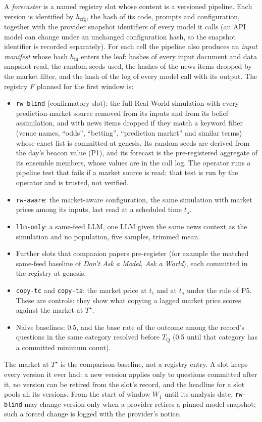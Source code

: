 \documentclass[11pt]{article}
\newcommand{\Ts}{T^{\star}}
\newcommand{\tQ}{T_{\mathrm{Q}}}
\newcommand{\tc}{t_{\mathrm{c}}}
\newcommand{\ta}{t_{\mathrm{a}}}
\begin{document}
A \emph{forecaster} is a named registry slot whose content is a versioned pipeline. Each version is identified by $h_{\mathrm{cfg}}$, the hash of its code, prompts and configuration, together with the provider snapshot identifiers of every model it calls (an API model can change under an unchanged configuration hash, so the snapshot identifier is recorded separately). For each cell the pipeline also produces an \emph{input manifest} whose hash $h_{\mathrm{in}}$ enters the leaf: hashes of every input document and data snapshot read, the random seeds used, the hashes of the news items dropped by the market filter, and the hash of the log of every model call with its output. The registry $F$ planned for the first window is:
\begin{itemize}
  \item \texttt{rw-blind} (confirmatory slot): the full Real World simulation with every prediction-market source removed from its inputs and from its belief assimilation, and with news items dropped if they match a keyword filter (venue names, ``odds'', ``betting'', ``prediction market'' and similar terms) whose exact list is committed at genesis. Its random seeds are derived from the day's beacon value (P1), and its forecast is the pre-registered aggregate of its ensemble members, whose values are in the call log. The operator runs a pipeline test that fails if a market source is read; that test is run by the operator and is trusted, not verified.
  \item \texttt{rw-aware}: the market-aware configuration, the same simulation with market prices among its inputs, last read at a scheduled time $\ta$.
  \item \texttt{llm-only}: a same-feed LLM, one LLM given the same news context as the simulation and no population, five samples, trimmed mean.
  \item Further slots that companion papers pre-register (for example the matched same-feed baseline of \emph{Don't Ask a Model, Ask a World}), each committed in the registry at genesis.
  \item \texttt{copy-tc} and \texttt{copy-ta}: the market price at $\tc$ and at $\ta$ under the rule of P5. These are controls: they show what copying a lagged market price scores against the market at $\Ts$.
  \item Naive baselines: $0.5$, and the base rate of the outcome among the record's questions in the same category resolved before $\tQ$ (0.5 until that category has a committed minimum count).
\end{itemize}
The market at $\Ts$ is the comparison baseline, not a registry entry. A slot keeps every version it ever had: a new version applies only to questions committed after it, no version can be retired from the slot's record, and the headline for a slot pools all its versions. From the start of window $W_1$ until its analysis date, \texttt{rw-blind} may change version only when a provider retires a pinned model snapshot; such a forced change is logged with the provider's notice.
\end{document}
